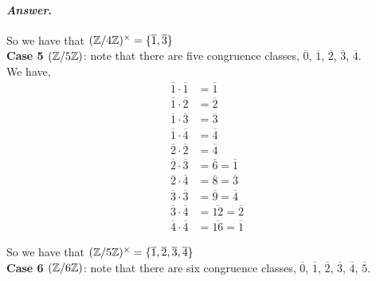 \documentclass[11pt, reqno]{amsart}
\theoremstyle{plain}
\theoremstyle{definition}
\theoremstyle{example}
\newenvironment{ans}{\color{black}\medskip \paragraph*{\emph{Answer}.}}{\hfill \break  $~\!\!$ \dotfill \medskip }
\begin{document}
\begin{enumerate}[1.]
\begin{enumerate}
\begin{ans}
So we have that $(\mathbb{Z}/4\mathbb{Z})^{\times} = \{\overline{1}, \overline{3}\}$\\

\textbf{Case 5 $(\mathbb{Z}/5\mathbb{Z})$}: note that there are five congruence classes, $\overline{0}$, $\overline{1}$, $\overline{2}$, $\overline{3}$, $\overline{4}$.\\

We have,
\begin{align*}
\overline{1} \cdot \overline{1} &= \overline{1}\\
\overline{1} \cdot \overline{2} &= \overline{2}\\
\overline{1} \cdot \overline{3} &= \overline{3}\\
\overline{1} \cdot \overline{4} &= \overline{4}\\
\overline{2} \cdot \overline{2} &= \overline{4}\\
\overline{2} \cdot \overline{3} &= \overline{6} = \overline{1}\\
\overline{2} \cdot \overline{4} &= \overline{8} = \overline{3}\\
\overline{3} \cdot \overline{3} &= \overline{9} = \overline{4}\\
\overline{3} \cdot \overline{4} &= \overline{12} = \overline{2}\\
\overline{4} \cdot \overline{4} &= \overline{16} = \overline{1}
\end{align*}

So we have that $(\mathbb{Z}/5\mathbb{Z})^{\times} = \{\overline{1}, \overline{2}, \overline{3}, \overline{4}\}$\\

\newpage
\textbf{Case 6 $(\mathbb{Z}/6\mathbb{Z})$}: note that there are six congruence classes, $\overline{0}$, $\overline{1}$, $\overline{2}$, $\overline{3}$, $\overline{4}$, $\overline{5}$.\\


\end{ans}
\end{enumerate}
\end{enumerate}
\end{document}
